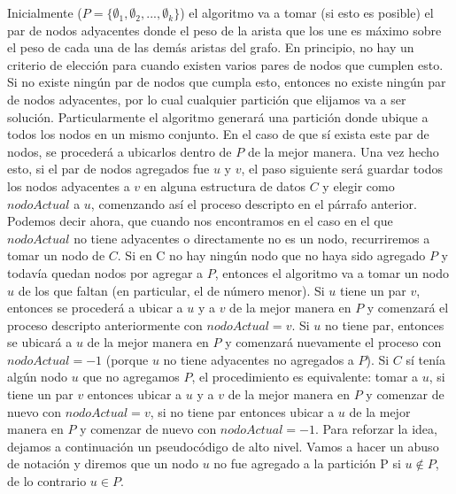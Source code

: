 \documentclass[a4paper]{article}
\begin{document}
\newline Inicialmente ($P = \{\emptyset_1, \emptyset_2, ..., \emptyset_k\}$) el algoritmo va a tomar (si esto es posible) el par de nodos adyacentes donde el peso de la arista que los une es máximo sobre el peso de cada una de las demás aristas del grafo. En principio, no hay un criterio de elección para cuando existen varios pares de nodos que cumplen esto. Si no existe ningún par de nodos que cumpla esto, entonces no existe ningún par de nodos adyacentes, por lo cual cualquier partición que elijamos va a ser solución. Particularmente el algoritmo generará una partición donde ubique a todos los nodos en un mismo conjunto. En el caso de que sí exista este par de nodos, se procederá a ubicarlos dentro de $P$ de la mejor manera. Una vez hecho esto, si el par de nodos agregados fue $u$ y $v$, el paso siguiente será guardar todos los nodos adyacentes a $v$ en alguna estructura de datos $C$ y elegir como $nodoActual$ a $u$, comenzando así el proceso descripto en el párrafo anterior. Podemos decir ahora, que cuando nos encontramos en el caso en el que $nodoActual$ no tiene adyacentes o directamente no es un nodo, recurriremos a tomar un nodo de $C$.
\newline Si en C no hay ningún nodo que no haya sido agregado $P$ y todavía quedan nodos por agregar a $P$, entonces el algoritmo va a tomar un nodo $u$ de los que faltan (en particular, el de número menor). Si $u$ tiene un par $v$, entonces se procederá a ubicar a $u$ y a $v$ de la mejor manera en $P$ y comenzará el proceso descripto anteriormente con $nodoActual = v$. Si $u$ no tiene par, entonces se ubicará a $u$ de la mejor manera en $P$ y comenzará nuevamente el proceso con $nodoActual = -1$ (porque $u$ no tiene adyacentes no agregados a $P$).
\newline Si $C$ sí tenía algún nodo $u$ que no agregamos $P$, el procedimiento es equivalente: tomar a $u$, si tiene un par $v$ entonces ubicar a $u$ y a $v$ de la mejor manera en $P$ y comenzar de nuevo con $nodoActual = v$, si no tiene par entonces ubicar a $u$ de la mejor manera en $P$ y comenzar de nuevo con $nodoActual = -1$.
\vspace{0.8cm}
\noindent Para reforzar la idea, dejamos a continuación un pseudocódigo de alto nivel.
\newline
Vamos a hacer un abuso de notación y diremos que un nodo $u$ no fue agregado a la partición P si $u \notin P$, de lo contrario $u \in P$.
\end{document}

